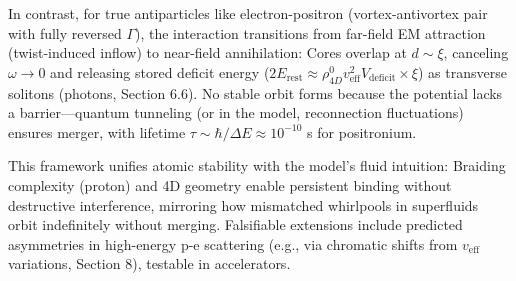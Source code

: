 In contrast, for true antiparticles like electron-positron (vortex-antivortex pair with fully reversed $\Gamma$), the interaction transitions from far-field EM attraction (twist-induced inflow) to near-field annihilation: Cores overlap at $d \sim \xi$, canceling $\omega \to 0$ and releasing stored deficit energy ($2 E_{\text{rest}} \approx \rho_{4D}^0 v_{\text{eff}}^2 V_{\text{deficit}} \times \xi$) as transverse solitons (photons, Section 6.6). No stable orbit forms because the potential lacks a barrier—quantum tunneling (or in the model, reconnection fluctuations) ensures merger, with lifetime $\tau \sim \hbar / \Delta E \approx 10^{-10}$ s for positronium.

This framework unifies atomic stability with the model's fluid intuition: Braiding complexity (proton) and 4D geometry enable persistent binding without destructive interference, mirroring how mismatched whirlpools in superfluids orbit indefinitely without merging. Falsifiable extensions include predicted asymmetries in high-energy p-e scattering (e.g., via chromatic shifts from $v_{\text{eff}}$ variations, Section 8), testable in accelerators.
